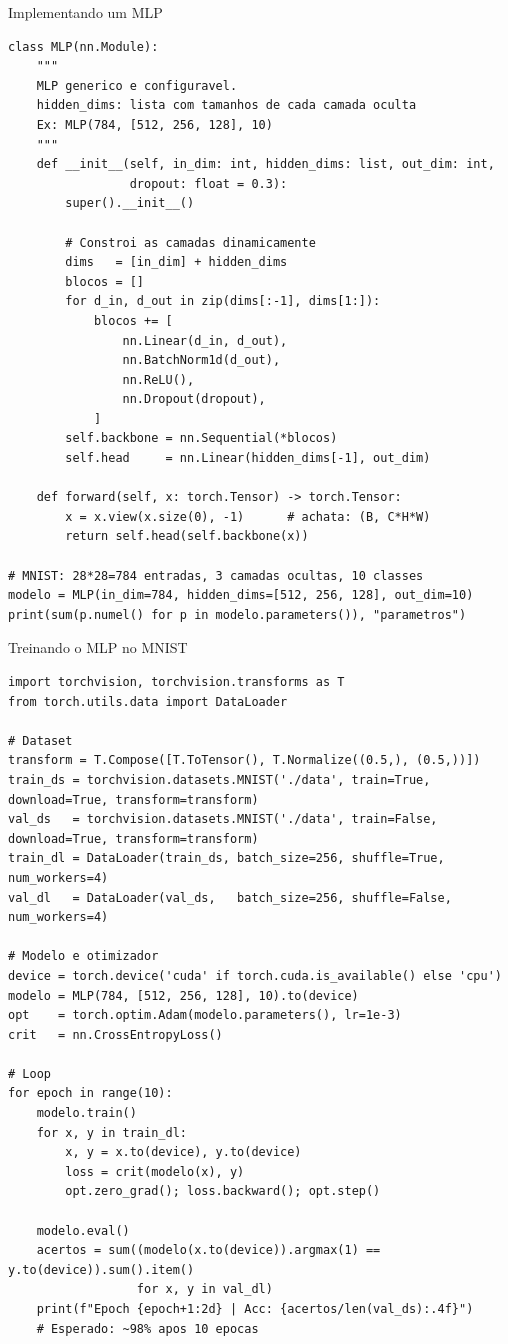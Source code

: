 \documentclass[aspectratio=169, 10pt]{beamer}
\begin{document}
\begin{frame}[fragile]{Implementando um MLP}
\begin{lstlisting}
class MLP(nn.Module):
    """
    MLP generico e configuravel.
    hidden_dims: lista com tamanhos de cada camada oculta
    Ex: MLP(784, [512, 256, 128], 10)
    """
    def __init__(self, in_dim: int, hidden_dims: list, out_dim: int,
                 dropout: float = 0.3):
        super().__init__()

        # Constroi as camadas dinamicamente
        dims   = [in_dim] + hidden_dims
        blocos = []
        for d_in, d_out in zip(dims[:-1], dims[1:]):
            blocos += [
                nn.Linear(d_in, d_out),
                nn.BatchNorm1d(d_out),
                nn.ReLU(),
                nn.Dropout(dropout),
            ]
        self.backbone = nn.Sequential(*blocos)
        self.head     = nn.Linear(hidden_dims[-1], out_dim)

    def forward(self, x: torch.Tensor) -> torch.Tensor:
        x = x.view(x.size(0), -1)      # achata: (B, C*H*W)
        return self.head(self.backbone(x))

# MNIST: 28*28=784 entradas, 3 camadas ocultas, 10 classes
modelo = MLP(in_dim=784, hidden_dims=[512, 256, 128], out_dim=10)
print(sum(p.numel() for p in modelo.parameters()), "parametros")
\end{lstlisting}
\end{frame}


\begin{frame}[fragile]{Treinando o MLP no MNIST}
\begin{lstlisting}[style=small]
import torchvision, torchvision.transforms as T
from torch.utils.data import DataLoader

# Dataset
transform = T.Compose([T.ToTensor(), T.Normalize((0.5,), (0.5,))])
train_ds = torchvision.datasets.MNIST('./data', train=True,  download=True, transform=transform)
val_ds   = torchvision.datasets.MNIST('./data', train=False, download=True, transform=transform)
train_dl = DataLoader(train_ds, batch_size=256, shuffle=True,  num_workers=4)
val_dl   = DataLoader(val_ds,   batch_size=256, shuffle=False, num_workers=4)

# Modelo e otimizador
device = torch.device('cuda' if torch.cuda.is_available() else 'cpu')
modelo = MLP(784, [512, 256, 128], 10).to(device)
opt    = torch.optim.Adam(modelo.parameters(), lr=1e-3)
crit   = nn.CrossEntropyLoss()

# Loop
for epoch in range(10):
    modelo.train()
    for x, y in train_dl:
        x, y = x.to(device), y.to(device)
        loss = crit(modelo(x), y)
        opt.zero_grad(); loss.backward(); opt.step()

    modelo.eval()
    acertos = sum((modelo(x.to(device)).argmax(1) == y.to(device)).sum().item()
                  for x, y in val_dl)
    print(f"Epoch {epoch+1:2d} | Acc: {acertos/len(val_ds):.4f}")
    # Esperado: ~98% apos 10 epocas
\end{lstlisting}
\end{frame}
\end{document}
